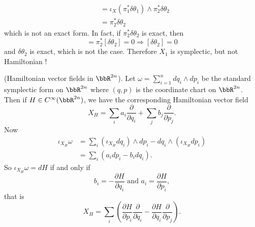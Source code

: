 \begin{example}
\begin{equation}
\begin{split}
         &=\iota_X(\pi_1^*\delta\theta_1)\wedge\pi_2^*\delta\theta_2\\
         &=\pi_2^*\delta\theta_2
    \end{split}
\end{equation}
 which is not an exact form. In fact, if $\pi_2^*\delta\theta_2$ is exact, then 
 \begin{equation}
    [\pi_2^*\delta\theta_2]=\pi_2^* [\delta\theta_2]=0\Rightarrow [\delta\theta_2]=0
 \end{equation}
 and $\delta\theta_2$ is exact, which is not the case. Therefore $X_1$ is symplectic, but not 
 Hamiltonian !
\end{example}

\begin{example}
    (Hamiltonian vector fields in $\bbR^{2n}$). Let $\omega=\sum_{i=1}^ndq_i\wedge dp_i$ be the standard 
    symplectic form on $\bbR^{2n}$ where $(q,p)$ is the coordinate chart on $\bbR^{2n}$. Then if $H\in C^\infty(\bbR^{2n})$, 
    we have the corresponding Hamiltonian vector field 
    \begin{equation}
        X_H=\sum_ia_i\frac{\partial}{\partial q_i}+\sum_jb_j\frac{\partial}{\partial p_j}.
    \end{equation}
    Now 
    \begin{equation}
        \begin{split}
             \iota_{X_H}\omega &=\sum_i (\iota_{X_H}dq_i)\wedge dp_i-dq_i\wedge (\iota_{X_H}dp_i)\\
             &=\sum_i (a_idp_i-b_idq_i).
        \end{split}
    \end{equation}
    So $\iota_{X_H}\omega = dH$ if and only if 
    \begin{equation}
        b_{i}=-\frac{\partial H}{\partial q_i}\text{ and }a_i=\frac{\partial H}{\partial p_i},
    \end{equation}
    that is 
    \begin{equation}
        X_H = \sum_i (\frac{\partial H}{\partial p_i}\frac{\partial}{\partial q_i}
        -\frac{\partial H}{\partial q_i}\frac{\partial}{\partial p_j}).
    \end{equation}
\end{example}

